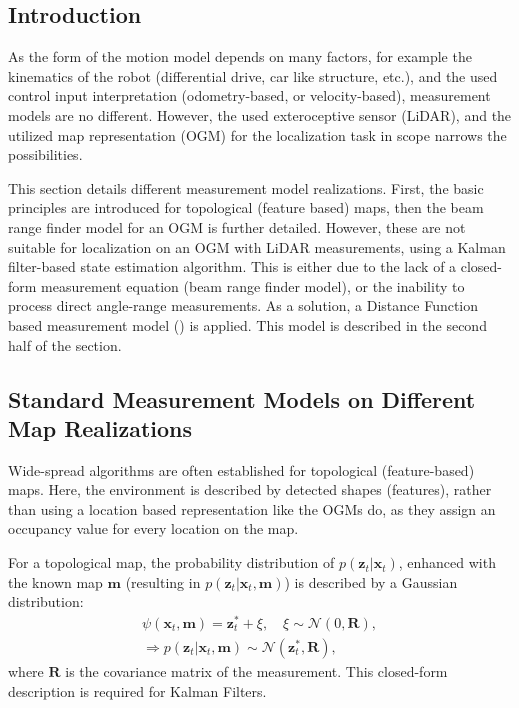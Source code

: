 \subsection{Introduction}
As the form of the motion model depends on many factors, for example the kinematics of the robot
(differential drive, car like structure, etc.), and the used control input interpretation
(odometry-based, or velocity-based), measurement models are no different.
However, the used exteroceptive sensor (LiDAR), and the utilized map representation (OGM)
for the localization task in scope narrows the possibilities.

This section details different measurement model realizations.
First, the basic principles are introduced for topological (feature based) maps,
then the beam range finder model for an OGM is further detailed.
However, these are not suitable for localization on an OGM with LiDAR measurements,
using a Kalman filter-based state estimation algorithm.
This is either due to the lack of a closed-form measurement equation (beam range finder model),
or the inability to process direct angle-range measurements.
As a solution, a Distance Function based measurement model  (\cite{Dantanarayana2013})
is applied. This model is described in the second half of the section.

\subsection{Standard Measurement Models on Different Map Realizations}
Wide-spread algorithms are often established for topological (feature-based) maps.
Here, the environment is described by detected shapes (features), rather than using a location based representation
like the OGMs do, as they assign an occupancy value for every location on the map.

For a topological map, the probability distribution of $p(\mathbf{\mathbf{z}}_t | \mathbf{x}_t)$,
enhanced with the known map $\mathbf{m}$ (resulting in $p(\mathbf{\mathbf{z}}_t | \mathbf{x}_t,\mathbf{m})$)
is described by a Gaussian distribution:
\begin{align}
    \psi(\mathbf{x}_t,\mathbf{m}) = \mathbf{z}^*_t + \xi, \quad \xi \sim \mathcal{N}(0,\mathbf{R}), \\
    \Rightarrow p(\mathbf{\mathbf{z}}_t | \mathbf{x}_t,\mathbf{m}) \sim \mathcal{N}(\mathbf{z}_t^*,\mathbf{R}),
\end{align}
where $\mathbf{R}$ is the covariance matrix of the measurement.
This closed-form description is required for Kalman Filters.

